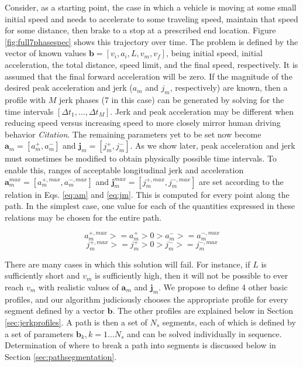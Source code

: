 \documentclass[letterpaper, 10 pt, conference]{ieeeconf}  %
\begin{document}
Consider, as a starting point, the case in which a vehicle is moving at some small initial speed and needs to accelerate to some traveling speed, maintain that speed for some distance, then brake to a stop at a prescribed end location.
Figure \ref{fig:full7phasespec} shows this trajectory over time.
The problem is defined by the vector of known values $\mathbf{b}  = [v_i, a_i, L, v_m, v_f]$, being initial speed, initial acceleration, the total distance, speed limit, and the final speed, respectively.
It is assumed that the final forward acceleration will be zero.
If the magnitude of the desired peak acceleration and jerk ($a_m$ and $j_m$, respectively) are known, then a profile with $M$ jerk phases (7 in this case) can be generated by solving for the time intervals $[\Delta t_1, ..., \Delta t_M]$.
Jerk and peak acceleration may be different when reducing speed versus increasing speed to more closely mirror human driving behavior \emph{Citation}.
The remaining parameters yet to be set now become $\mathbf{a}_m = [a^+_m , a^-_m]$ and $\mathbf{j}_m = [j^+_m , j^-_m]$.
As we show later, peak acceleration and jerk must sometimes be modified to obtain physically possible time intervals.
To enable this, ranges of acceptable longitudinal jerk and acceleration $\mathbf{a}^{max}_m = [a^{+,max}_m , a^{-,max}_m]$ and $\mathbf{j}^{max}_m = [j^{+,max}_m , j^{-,max}_m]$ are set according to the relation in Eqs. \ref{eq:am} and \ref{eq:jm}.
This is computed for every point along the path.
In the simplest case, one value for each of the quantities expressed in these relations may be chosen for the entire path.

\begin{equation}
  a^{+,max}_m >= a^+_m > 0 > a^-_m >= a^{-,max}_m
  \label{eq:am}
\end{equation}
\begin{equation}
  j^{+,max}_m >= j^+_m > 0 > j^-_m >= j^{-,max}_m
  \label{eq:jm}
\end{equation}

There are many cases in which this solution will fail.
For instance, if $L$ is sufficiently short and $v_m$ is sufficiently high, then it will not be possible to ever reach $v_m$ with realistic values of $\mathbf{a}_m$ and $\mathbf{j}_m$.
We propose to define 4 other basic profiles, and our algorithm judiciously chooses the appropriate profile for every segment defined by a vector $\mathbf{b}$.
The other profiles are explained below in Section \ref{sec:jerkprofiles}.
A path is then a set of $N_s$ segments, each of which is defined by a set of parameters $\mathbf{b}_k, k = 1 ... N_s$ and can be solved individually in sequence.
Determination of where to break a path into segments is discussed below in Section \ref{sec:pathsegmentation}.
\end{document}
